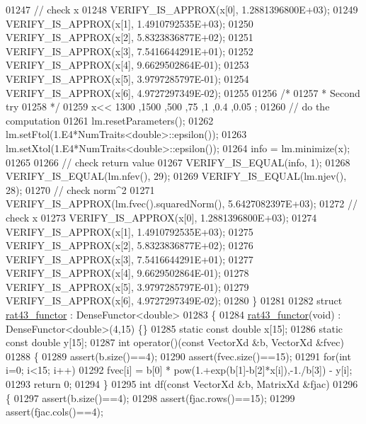 \begin{DoxyCode}
01247   \textcolor{comment}{// check x}
01248   VERIFY\_IS\_APPROX(x[0], 1.2881396800E+03);
01249   VERIFY\_IS\_APPROX(x[1], 1.4910792535E+03);
01250   VERIFY\_IS\_APPROX(x[2], 5.8323836877E+02);
01251   VERIFY\_IS\_APPROX(x[3], 7.5416644291E+01);
01252   VERIFY\_IS\_APPROX(x[4], 9.6629502864E-01);
01253   VERIFY\_IS\_APPROX(x[5], 3.9797285797E-01);
01254   VERIFY\_IS\_APPROX(x[6], 4.9727297349E-02);
01255 
01256   \textcolor{comment}{/*}
01257 \textcolor{comment}{   * Second try}
01258 \textcolor{comment}{   */}
01259   x<< 1300 ,1500 ,500  ,75   ,1    ,0.4  ,0.05  ;
01260   \textcolor{comment}{// do the computation}
01261   lm.resetParameters();
01262   lm.setFtol(1.E4*NumTraits<double>::epsilon());
01263   lm.setXtol(1.E4*NumTraits<double>::epsilon());
01264   info = lm.minimize(x);
01265 
01266   \textcolor{comment}{// check return value}
01267   VERIFY\_IS\_EQUAL(info, 1);
01268   VERIFY\_IS\_EQUAL(lm.nfev(), 29);
01269   VERIFY\_IS\_EQUAL(lm.njev(), 28);
01270   \textcolor{comment}{// check norm^2}
01271   VERIFY\_IS\_APPROX(lm.fvec().squaredNorm(), 5.6427082397E+03);
01272   \textcolor{comment}{// check x}
01273   VERIFY\_IS\_APPROX(x[0], 1.2881396800E+03);
01274   VERIFY\_IS\_APPROX(x[1], 1.4910792535E+03);
01275   VERIFY\_IS\_APPROX(x[2], 5.8323836877E+02);
01276   VERIFY\_IS\_APPROX(x[3], 7.5416644291E+01);
01277   VERIFY\_IS\_APPROX(x[4], 9.6629502864E-01);
01278   VERIFY\_IS\_APPROX(x[5], 3.9797285797E-01);
01279   VERIFY\_IS\_APPROX(x[6], 4.9727297349E-02);
01280 \}
01281 
01282 \textcolor{keyword}{struct }\hyperlink{structrat43__functor}{rat43\_functor} : DenseFunctor<double>
01283 \{
01284     \hyperlink{structrat43__functor}{rat43\_functor}(\textcolor{keywordtype}{void}) : DenseFunctor<double>(4,15) \{\}
01285     \textcolor{keyword}{static} \textcolor{keyword}{const} \textcolor{keywordtype}{double} x[15];
01286     \textcolor{keyword}{static} \textcolor{keyword}{const} \textcolor{keywordtype}{double} y[15];
01287     \textcolor{keywordtype}{int} operator()(\textcolor{keyword}{const} VectorXd &b, VectorXd &fvec)
01288     \{
01289         assert(b.size()==4);
01290         assert(fvec.size()==15);
01291         \textcolor{keywordflow}{for}(\textcolor{keywordtype}{int} i=0; i<15; i++)
01292             fvec[i] = b[0] * pow(1.+exp(b[1]-b[2]*x[i]),-1./b[3]) - y[i];
01293         \textcolor{keywordflow}{return} 0;
01294     \}
01295     \textcolor{keywordtype}{int} df(\textcolor{keyword}{const} VectorXd &b, MatrixXd &fjac)
01296     \{
01297         assert(b.size()==4);
01298         assert(fjac.rows()==15);
01299         assert(fjac.cols()==4);

\end{DoxyCode}
